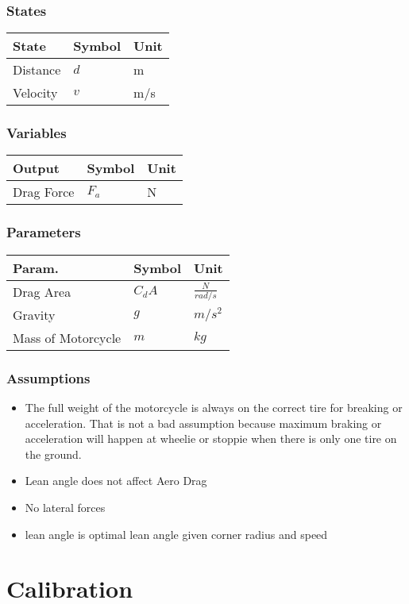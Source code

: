 \documentclass[../SimBALink.tex]{subfiles}
\begin{document}
\subsubsection{States}
	\begin{tabular}{ l | l | l  }
		State					&	Symbol		&	Unit		\\	\hline
		Distance				&	$d$			& 	m \\
		Velocity 				&	$v$			&	m/s \\
	\end{tabular}
\subsubsection{Variables}
	\begin{tabular}{ l | l | l  }
		Output					&	Symbol		&	Unit		\\	\hline
		Drag Force				&	$F_a$		&  N
						
	\end{tabular}
\subsubsection{Parameters}
	\begin{tabular}{ l | l | l  }
		Param.					&	Symbol		&	Unit		\\	\hline
		Drag Area				&	$C_dA$		&	 $\frac{N}{rad/s}$ \\		
		Gravity 				&	$g$			&	$m/s^2$ \\
		Mass of Motorcycle		&	$m$			&  $kg$				
	\end{tabular}

\subsubsection{Assumptions}
\begin{itemize}
    \item The full weight of the motorcycle is always on the correct tire for breaking or acceleration. That is not a bad assumption because maximum braking or acceleration will happen at wheelie or stoppie when there is only one tire on the ground.
    \item Lean angle does not affect Aero Drag
    \item No lateral forces
    \item lean angle is optimal lean angle given corner radius and speed
\end{itemize}

\section{Calibration}
\end{document}
